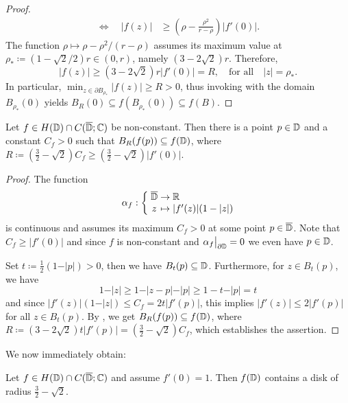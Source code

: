 \begin{proof}
\begin{align*}
        \Longleftrightarrow \quad \vert f(z) \vert &\geq \left( \rho - \frac{\rho^2}{r - \rho} \right) \vert f'(0) \vert.
    \end{align*}
    The function $\rho \mapsto \rho - \rho^2 / (r - \rho)$ assumes its maximum value at $\rho_* \coloneqq (1 - \sqrt{2} / 2)r \in (0, r)$, namely $(3 - 2 \sqrt{2}) r$. Therefore,
    \begin{equation*}
        \vert f(z) \vert \geq (3 - 2 \sqrt{2}) r \vert f'(0) \vert = R, \quad \textrm{for all} \quad \vert z \vert = \rho_*.
    \end{equation*}
    In particular, $\min_{z \in \partial B_{\rho_*}} \vert f(z) \vert \geq R > 0$, thus invoking  with the domain $B_{\rho_*}(0)$ yields $B_{R}(0) \subseteq f(B_{\rho_*}(0)) \subseteq f(B)$.
\end{proof}

\begin{theorem} \label{thm:bloch-stronger}
    Let $f \in H(\mathbb{D}) \cap C(\overline{\mathbb{D}}; \mathbb{C})$ be non-constant. Then there is a point $p \in \mathbb{D}$ and a constant $C_f > 0$ such that $B_{R}(f(p)) \subseteq f(\mathbb{D})$, where $R \coloneqq (\frac{3}{2} - \sqrt{2}) C_f \geq (\frac{3}{2} - \sqrt{2}) \vert f'(0) \vert$.
\end{theorem}

\begin{proof}
    The function
    $$ \mapping{\alpha_f}{\cl{\D} & \to & \R}{z & \mapsto & \vert f'(z) \vert (1 - \vert z \vert)} $$
    is continuous and assumes its maximum $C_f > 0$ at some point $p \in \overline{\mathbb{D}}$. Note that $C_f \geq \vert f'(0) \vert$ and since $f$ is non-constant and $\restr{\alpha_f}{\partial \D} = 0$ we even have $p \in \mathbb{D}$.

    Set $t \coloneqq \frac{1}{2}(1 - \vert p \vert) > 0$, then we have $B_{t}(p) \subseteq \mathbb{D}$. Furthermore, for $z \in B_t(p)$, we have
    $$ 1 - \vert z \vert \geq 1 - \vert z - p \vert - \vert p \vert \geq 1 - t - \vert p \vert = t $$
    and since $\vert f'(z) \vert (1 - \vert z \vert) \leq C_f = 2 t \vert f'(p) \vert$, this implies $\vert f'(z) \vert \leq 2 \vert f'(p) \vert$ for all $z \in B_t(p)$. By , we get $ B_{R}(f(p)) \subseteq f(\mathbb{D}) $, where $R \coloneqq (3 - 2 \sqrt{2}) t \vert f'(p) \vert = ({\textstyle \frac{3}{2}} - \sqrt{2}) C_f$,
    which establishes the assertion.
\end{proof}

We now immediately obtain:    

\begin{theorem}[Bloch] \label{thm:bloch}
    Let $f \in H(\mathbb{D}) \cap C(\overline{\mathbb{D}}; \mathbb{C})$ and assume $f'(0) = 1$. Then $f(\mathbb{D})$ contains a disk of radius $\frac{3}{2} - \sqrt{2}$.
\end{theorem}


